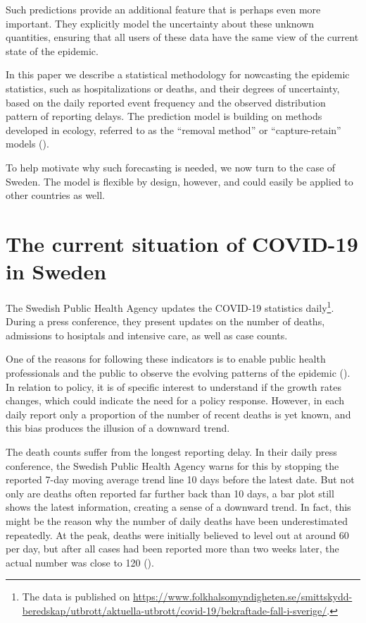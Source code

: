 \documentclass[a4paper,11pt,article,oneside,openany,american]{memoir}
\begin{document}
Such predictions provide an additional feature that is perhaps even more important. They explicitly model the uncertainty about these unknown quantities, ensuring that all users of these data have the same view of the current state of the epidemic.

In this paper we describe a statistical methodology for nowcasting the epidemic statistics, such as hospitalizations or deaths, and their degrees of uncertainty, based on the daily reported event frequency and the observed distribution pattern of reporting delays. The prediction model is building on methods developed in ecology, referred to as the ``removal method'' or ``capture-retain'' models (\cite{Pollock1991_review_papers}).

To help motivate why such forecasting is needed, we now turn to the case of Sweden. The model is flexible by design, however, and could easily be applied to other countries as well.

\section{The current situation of COVID-19 in Sweden}
The Swedish Public Health Agency updates the COVID-19 statistics daily\footnote{The data is published on \url{https://www.folkhalsomyndigheten.se/smittskydd-beredskap/utbrott/aktuella-utbrott/covid-19/bekraftade-fall-i-sverige/}.}. During a press conference, they present updates on the number of deaths, admissions to hosiptals and intensive care, as well as case counts.

One of the reasons for following these indicators is to enable public health professionals and the public to observe the evolving patterns of the epidemic (\cite{Anderson2020_how_will}). In relation to policy, it is of specific interest to understand if the growth rates changes, which could indicate the need for a policy response. However, in each daily report only a proportion of the number of recent deaths is yet known, and this bias produces the illusion of a downward trend.

The death counts suffer from the longest reporting delay. In their daily press conference, the Swedish Public Health Agency warns for this by stopping the reported 7-day moving average trend line 10 days before the latest date. But not only are deaths often reported far further back than 10 days, a bar plot still shows the latest information, creating a sense of a downward trend. In fact, this might be the reason why the number of daily deaths have been underestimated repeatedly. At the peak, deaths were initially believed to level out at around 60 per day, but after all cases had been reported more than two weeks later, the actual number was close to 120 (\cite{Ohman2020_antalet_virusdoda}).
\end{document}
